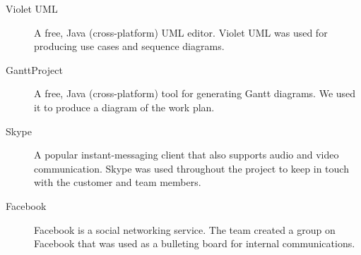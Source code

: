 \begin{description}
\item[Violet UML]
A free, Java (cross-platform) UML editor. Violet UML was used for producing use cases and sequence diagrams.

\item[GanttProject]
A free, Java (cross-platform) tool for generating Gantt diagrams. We used it to produce a diagram of the work plan.

\item[Skype]
A popular instant-messaging client that also supports audio and video communication.
Skype was used throughout the project to keep in touch with the customer and team members.

\item[Facebook]
Facebook is a social networking service. The team created a group on Facebook that was used as a bulleting board for internal communications.


\end{description}

